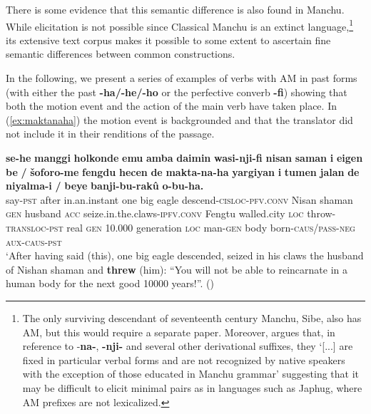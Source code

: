 \documentclass{article}
\newcommand{\ipa}[1]{\textbf{{\phon\mbox{#1}}}} %
\begin{document}
There is some evidence that this semantic difference is also found in Manchu. While elicitation is not possible since Classical Manchu is an extinct language,\footnote{The only surviving descendant of seventeenth century Manchu, Sibe, also has AM, but this would require a separate paper. Moreover, \citet[178]{zikmundova13sibe} argues that, in reference to -\ipa{na-}, \ipa{-nji-} and several other derivational suffixes, they `[...] are fixed in particular verbal forms and are not recognized by native speakers with the exception of those educated in Manchu grammar' suggesting that it may be difficult to elicit minimal pairs as in languages such as Japhug, where AM prefixes are not lexicalized. } its extensive text corpus makes it possible to some extent to ascertain fine semantic differences between common constructions.

In the following, we present a series of examples of verbs with AM in past forms (with either the past \ipa{-ha/-he/-ho} or the perfective converb \ipa{-fi}) showing that both the motion event and the action of the main verb have taken place. In (\ref{ex:maktanaha}) the motion event is backgrounded and that the translator did not include it in their renditions of the passage.

\begin{exe}
\ex  \label{ex:maktanaha}
\gll
\ipa{se-he} 	\ipa{manggi} 	\ipa{holkonde} 	\ipa{emu} 	\ipa{amba} 	\ipa{daimin} 	\ipa{wasi-nji-fi} 	\ipa{nisan} 	\ipa{saman} 	\ipa{i} 	\ipa{eigen} 	\ipa{be} 	\ipa{/} 	\ipa{šoforo-me} 	\ipa{fengdu} 	\ipa{hecen} 	\ipa{de} 	\ipa{makta-na-ha} 	\ipa{yargiyan} 	\ipa{i} 	\ipa{tumen} 	\ipa{jalan} 	\ipa{de} 	\ipa{niyalma-i} 	\ipa{/} 	\ipa{beye} 	\ipa{banji-bu-rakû} 	\ipa{o-bu-ha.} \\
say-\textsc{pst} after in.an.instant one big eagle descend-\textsc{cisloc}-\textsc{pfv.conv} Nisan shaman \textsc{gen} husband \textsc{acc} { } seize.in.the.claws-\textsc{ipfv.conv} Fengtu walled.city \textsc{loc} throw-\textsc{transloc-pst} real \textsc{gen} 10.000 generation \textsc{loc} man-\textsc{gen} { } body born-\textsc{caus/pass-neg} \textsc{aux-caus-pst} \\
\glt `After having said (this), one big eagle descended, seized in his claws the husband of Nishan shaman and \textbf{threw} (him): “You will not be able to reincarnate in a human body for the next good 10000 years!”. (\citealt[85,20b/119]{jaxontov93nisan})
\end{exe}
\end{document}
